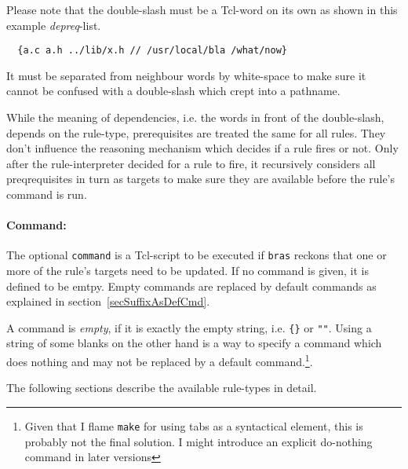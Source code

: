 \documentclass[12pt]{article}
\newcommand{\bras}{\texttt{bras}}
\newcommand{\make}{\texttt{make}}
\begin{document}
Please note that the double-slash must be a Tcl-word on its own as
shown in this example \textit{depreq}-list.
\begin{verbatim}
  {a.c a.h ../lib/x.h // /usr/local/bla /what/now}
\end{verbatim}
It must be separated from neighbour words by white-space to make sure
it cannot be confused with a double-slash which crept into a pathname.

While the meaning of dependencies, i.e. the words in front of the
double-slash, depends on the rule-type, prerequisites are treated the
same for all rules. They don't influence the reasoning mechanism which
decides if a rule fires or not. Only after the rule-interpreter
decided for a rule to fire, it recursively considers all
preqrequisites in turn as targets to make sure they are available
before the rule's command is run.

\paragraph{Command:}
The optional \texttt{command} is a Tcl-script to be executed if
\bras{} reckons that one or more of the rule's targets need to be
updated. If no command is given, it is defined to be emtpy. Empty
commands are replaced by default commands as explained in
section~\ref{secSuffixAsDefCmd}. 

A command is \textit{empty}, if it is exactly the empty string,
i.e. \verb+{}+ or \verb+""+. Using a string of some blanks on the
other hand is a way to specify a command which does nothing and may
not be replaced by a default command.\footnote{Given that I flame
\make{} for using tabs as a syntactical element, this is probably not
the final solution. I might introduce an explicit do-nothing
command in later versions}.

The following sections describe the available rule-types in detail.

\end{document}
